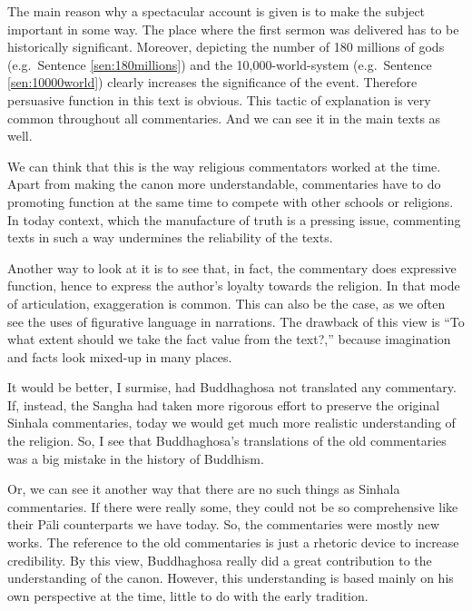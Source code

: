 The main reason why a spectacular account is given is to make the subject important in some way. The place where the first sermon was delivered has to be historically significant. Moreover, depicting the number of 180 millions of gods (e.g.\ Sentence \ref{sen:180millions}) and the 10,000-world-system (e.g.\ Sentence \ref{sen:10000world}) clearly increases the significance of the event. Therefore persuasive function in this text is obvious. This tactic of explanation is very common throughout all commentaries. And we can see it in the main texts as well.

We can think that this is the way religious commentators worked at the time. Apart from making the canon more understandable, commentaries have to do promoting function at the same time to compete with other schools or religions. In today context, which the manufacture of truth is a pressing issue, commenting texts in such a way undermines the reliability of the texts.

Another way to look at it is to see that, in fact, the commentary does expressive function, hence to express the author's loyalty towards the religion. In that mode of articulation, exaggeration is common. This can also be the case, as we often see the uses of figurative language in narrations. The drawback of this view is ``To what extent should we take the fact value from the text?,'' because imagination and facts look mixed-up in many places.

It would be better, I surmise, had Buddhaghosa not translated any commentary. If, instead, the Sangha had taken more rigorous effort to preserve the original Sinhala commentaries, today we would get much more realistic understanding of the religion. So, I see that Buddhaghosa's translations of the old commentaries was a big mistake in the history of Buddhism.

Or, we can see it another way that there are no such things as Sinhala commentaries. If there were really some, they could not be so comprehensive like their P\=ali counterparts we have today. So, the commentaries were mostly new works. The reference to the old commentaries is just a rhetoric device to increase credibility. By this view, Buddhaghosa really did a great contribution to the understanding of the canon. However, this understanding is based mainly on his own perspective at the time, little to do with the early tradition.
